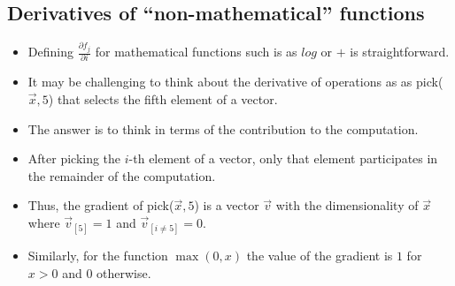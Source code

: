 \subsection{Derivatives of ``non-mathematical'' functions}
\begin{itemize}

\item Defining  $\frac{\partial f_j}{ \partial i}$ for mathematical functions such is as $log$ or $+$ is straightforward.

\item It may be challenging to think about the derivative of operations as as pick($\vec{x},5$) that selects the fifth element of a vector.

\item The answer is to think in terms of the contribution to the computation. 

\item After picking the $i$-th element of a vector, only that element participates in the remainder of the computation. 

\item Thus, the gradient of pick($\vec{x},5$) is a vector $\vec{v}$ with the dimensionality of $\vec{x}$ where $\vec{v}_{[5]} =1$ and $\vec{v}_{[i \neq 5]} = 0$.

\item Similarly, for the function $\max(0,x)$  the value of the gradient is $1$ for $x>0$ and $0$ otherwise.

\end{itemize}

